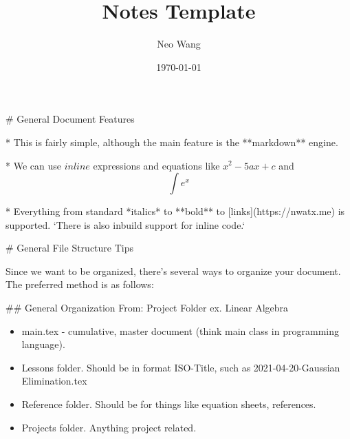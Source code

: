 \documentclass{article}
\title{Notes Template}
\author{Neo Wang}
\date{\today}
\begin{document}
\maketitle
\tableofcontents

\begin{markdown}

# General Document Features

* This is fairly simple, although the main feature is the **markdown** engine.

* We can use $inline$ expressions and equations like $x^2-5ax+c$ and $$\int e^x$$

* Everything from standard *italics* to **bold** to [links](https://nwatx.me) is supported. `There is also inbuild support for inline code.`

# General File Structure Tips

Since we want to be organized, there's several ways to organize your document. The preferred method is as follows:

## General Organization From: Project Folder ex. Linear Algebra

\begin{itemize}
    \item main.tex - cumulative, master document (think main class in programming language).
    \item Lessons folder. Should be in format ISO-Title, such as 2021-04-20-Gaussian Elimination.tex
    \item Reference folder. Should be for things like equation sheets, references.
    \item Projects folder. Anything project related.
\end{itemize}

\end{markdown}
\end{document}
